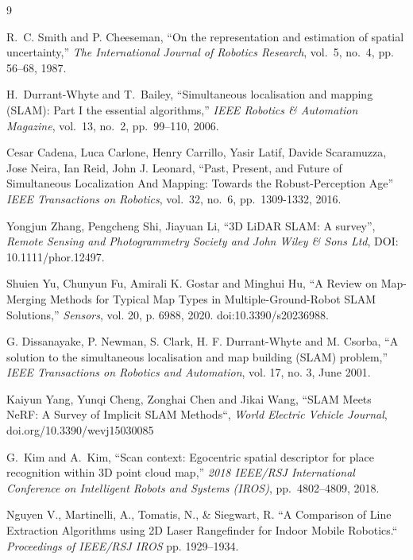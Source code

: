 \documentclass[11pt]{article}
\begin{document}
\begin{thebibliography}{9}
	
	
	R.~C. Smith and P. Cheeseman, 
	``On the representation and estimation of spatial uncertainty,'' 
	\emph{The International Journal of Robotics Research}, 
	vol.~5, no.~4, pp. 56--68, 1987.
	
	H.~Durrant-Whyte and T.~Bailey,
	``Simultaneous localisation and mapping (SLAM): Part I the essential algorithms,''
	\emph{IEEE Robotics \& Automation Magazine},
	vol.~13, no.~2, pp.~99--110, 2006.
	
	Cesar Cadena, Luca Carlone, Henry Carrillo, Yasir Latif, Davide Scaramuzza, Jose Neira, Ian Reid, John J. Leonard,
	``Past, Present, and Future of Simultaneous Localization And Mapping: Towards the
	Robust-Perception Age''
	\emph{IEEE Transactions on Robotics},
	vol.~32, no.~6, pp.~1309-1332, 2016.
	
	Yongjun Zhang, Pengcheng Shi, Jiayuan Li,
	``3D LiDAR SLAM: A survey'',
	\emph{Remote Sensing and Photogrammetry Society and John Wiley \& Sons Ltd},
	DOI: 10.1111/phor.12497.
	
	Shuien Yu, Chunyun Fu, Amirali K. Gostar and Minghui Hu,
	``A Review on Map-Merging Methods for Typical Map Types in Multiple-Ground-Robot SLAM Solutions,''
	\emph{Sensors}, vol. 20, p. 6988, 
	2020. doi:10.3390/s20236988.
	
	G. Dissanayake, P. Newman, S. Clark, H. F. Durrant-Whyte and M. Csorba, 
	``A solution to the simultaneous localisation and map building (SLAM) problem,'' 
	\emph{IEEE Transactions on Robotics and Automation}, vol. 17, no. 3, 
	June 2001.
	
	Kaiyun Yang, Yunqi Cheng, Zonghai Chen and Jikai Wang,
	``SLAM Meets NeRF: A Survey of Implicit SLAM Methods``,
	\emph{World Electric Vehicle Journal},
	doi.org/10.3390/wevj15030085
	
	G.~Kim and A.~Kim,
	``Scan context: Egocentric spatial descriptor for place recognition within 3D point cloud map,''
	\emph{2018 IEEE/RSJ International Conference on Intelligent Robots and Systems (IROS)},
	pp.~4802--4809, 2018.
	
	Nguyen V., Martinelli, A., Tomatis, N., \& Siegwart, R.
	``A Comparison of Line Extraction Algorithms using 2D Laser Rangefinder for Indoor Mobile Robotics.``
	\emph{Proceedings of IEEE/RSJ IROS}
	pp. 1929–1934.
	

\end{thebibliography}
\end{document}
